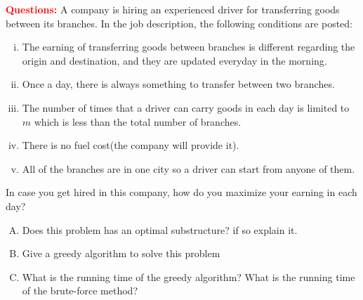 \problem

\textcolor{Red}{\textbf{Questions:}}
A company is hiring an experienced driver for transferring goods between its branches. In the job description, the following conditions are posted:
\begin{enumerate}[i.]
	\item The earning of transferring goods between branches is different regarding the origin and destination, and they are updated everyday in the morning.
	\item Once a day, there is always something to transfer between two branches.
	\item The number of times that a driver can carry goods in each day is limited to $m$ which is less than the total number of branches.
	\item There is no fuel cost(the company will provide it).
	\item All of the branches are in one city so a driver can start from anyone of them.
\end{enumerate}

In case you get hired in this company, how do you maximize your earning in each day?

\begin{enumerate}[A.]
	\item Does this problem has an optimal substructure? if so explain it.
	\item Give a greedy algorithm to solve this problem
	\item What is the running time of the greedy algorithm? What is the running time of the brute-force method?
\end{enumerate}

